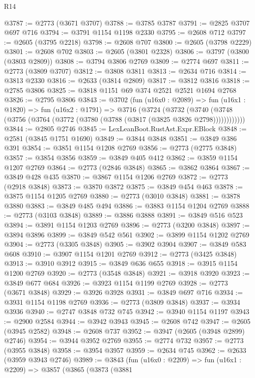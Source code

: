 \begin{lexlean}{R14}
\begin{coremodule}
@3787 := @2773 (@3671 @3707)
@3788 := @3785 @3787
@3791 := @2825 @3707 @697 @716
@3794 := @3791 @1154 @1198 @2330
@3795 := @2608 @712
@3797 := @2605 (@3795 @2218)
@3798 := @2608 @707
@3800 := @2605 (@3798 @2229)
@3801 := @2608 @702
@3803 := @2605 (@3801 @2328)
@3806 := @3797 (@3800 (@3803 @2809))
@3808 := @3794 @3806 @2769
@3809 := @2774 @697
@3811 := @2773 (@3809 @3707)
@3812 := @3808 @3811
@3813 := @2634 @716
@3814 := @3813 @2330
@3816 := @2633 (@3814 @2809)
@3817 := @3812 @3816
@3818 := @2785 @3806
@3825 := @3818 @1151 @69 @374 @2521 @2521 @1694 @2768
@3826 := @2795 @3806
@3843 := @3702
    (fun (u16x0 : @2089) =>
    fun (u16x1 : @1820) =>
    fun (u16x2 : @1791) =>
    @3716
      (@3724
        (@3732
          (@3740 (@3748 (@3756 (@3764 (@3772 (@3780 (@3788 (@3817 (@3825 @3826 @2798))))))))))))
@3844 := @2805 @2746
@3845 := LexLeanBoot.RustAst.Expr.EBlock
@3848 := @2581 (@3845 @1751 @1690)
@3849 := @3844 @3848
@3851 := @3849 @386 @391
@3854 := @3851 @1154 @1208 @2769
@3856 := @2773 (@2775 @3848)
@3857 := @3854 @3856
@3859 := @3849 @405 @412
@3862 := @3859 @1154 @1207 @2769
@3864 := @2773 (@2846 @3848)
@3865 := @3862 @3864
@3867 := @3849 @428 @435
@3870 := @3867 @1154 @1206 @2769
@3872 := @2773 (@2918 @3848)
@3873 := @3870 @3872
@3875 := @3849 @454 @463
@3878 := @3875 @1154 @1205 @2769
@3880 := @2773 (@3010 @3848)
@3881 := @3878 @3880
@3883 := @3849 @485 @494
@3886 := @3883 @1154 @1204 @2769
@3888 := @2773 (@3103 @3848)
@3889 := @3886 @3888
@3891 := @3849 @516 @523
@3894 := @3891 @1154 @1203 @2769
@3896 := @2773 (@3200 @3848)
@3897 := @3894 @3896
@3899 := @3849 @542 @561
@3902 := @3899 @1154 @1202 @2769
@3904 := @2773 (@3305 @3848)
@3905 := @3902 @3904
@3907 := @3849 @583 @608
@3910 := @3907 @1154 @1201 @2769
@3912 := @2773 (@3425 @3848)
@3913 := @3910 @3912
@3915 := @3849 @636 @655
@3918 := @3915 @1154 @1200 @2769
@3920 := @2773 (@3548 @3848)
@3921 := @3918 @3920
@3923 := @3849 @677 @684
@3926 := @3923 @1154 @1199 @2769
@3928 := @2773 (@3671 @3848)
@3929 := @3926 @3928
@3931 := @3849 @697 @716
@3934 := @3931 @1154 @1198 @2769
@3936 := @2773 (@3809 @3848)
@3937 := @3934 @3936
@3940 := @2747 @3848 @732 @745
@3942 := @3940 @1154 @1197
@3943 := @2900 @2584
@3944 := @3942 @3943
@3945 := @2608 @742
@3947 := @2605 (@3945 @2582)
@3948 := @2608 @737
@3952 := @3947 (@2605 (@3948 @2899) @2746)
@3954 := @3944 @3952 @2769
@3955 := @2774 @732
@3957 := @2773 (@3955 @3848)
@3958 := @3954 @3957
@3959 := @2634 @745
@3962 := @2633 (@3959 @3943 @2746)
@3989 := @3843
    (fun (u16x0 : @2209) =>
    fun (u16x1 : @2209) =>
    @3857
      (@3865
        (@3873
          (@3881

\end{coremodule}
\end{lexlean}
